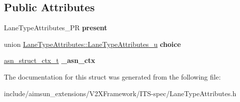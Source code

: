 \subsection*{Public Attributes}
\begin{DoxyCompactItemize}
\item 
Lane\+Type\+Attributes\+\_\+\+PR {\bfseries present}\hypertarget{structLaneTypeAttributes_aae0cb0ed8fb7c67b56262f1d7632251b}{}\label{structLaneTypeAttributes_aae0cb0ed8fb7c67b56262f1d7632251b}

\item 
union \hyperlink{unionLaneTypeAttributes_1_1LaneTypeAttributes__u}{Lane\+Type\+Attributes\+::\+Lane\+Type\+Attributes\+\_\+u} {\bfseries choice}\hypertarget{structLaneTypeAttributes_ad1fa158b749e3ed02e758a8ee9d96a92}{}\label{structLaneTypeAttributes_ad1fa158b749e3ed02e758a8ee9d96a92}

\item 
\hyperlink{structasn__struct__ctx__s}{asn\+\_\+struct\+\_\+ctx\+\_\+t} {\bfseries \+\_\+asn\+\_\+ctx}\hypertarget{structLaneTypeAttributes_a3a98c958eae387546b1749a9ccc1acf5}{}\label{structLaneTypeAttributes_a3a98c958eae387546b1749a9ccc1acf5}

\end{DoxyCompactItemize}


The documentation for this struct was generated from the following file\+:\begin{DoxyCompactItemize}
\item 
include/aimsun\+\_\+extensions/\+V2\+X\+Framework/\+I\+T\+S-\/spec/Lane\+Type\+Attributes.\+h\end{DoxyCompactItemize}
